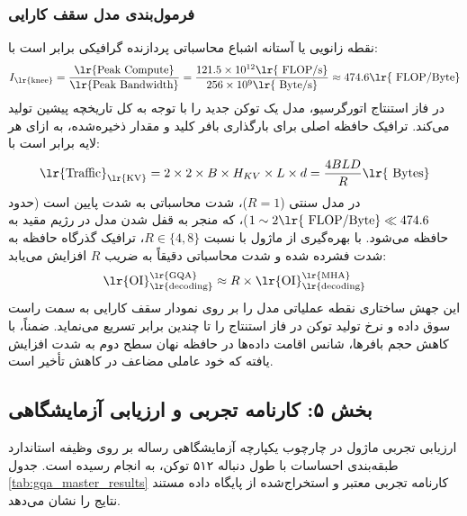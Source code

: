 \subsubsection*{فرمول‌بندی مدل سقف کارایی }
نقطه زانویی یا آستانه اشباع محاسباتی  پردازنده گرافیکی  برابر است با:
\begin{equation}
I_{\text{\lr{knee}}} = \frac{\text{\lr{Peak Compute}}}{\text{\lr{Peak Bandwidth}}} = \frac{121.5 \times 10^{12} \text{\lr{ FLOP/s}}}{256 \times 10^9 \text{\lr{ Byte/s}}} \approx 474.6 \text{\lr{ FLOP/Byte}}
\end{equation}
در فاز استنتاج اتورگرسیو، مدل یک توکن جدید را با توجه به کل تاریخچه پیشین تولید می‌کند. ترافیک حافظه اصلی برای بارگذاری بافر کلید و مقدار ذخیره‌شده، به ازای هر لایه برابر است با:
\begin{equation}
\text{\lr{Traffic}}_{\text{\lr{KV}}} = 2 \times 2 \times B \times H_{KV} \times L \times d = \frac{4 B L D}{R} \text{\lr{ Bytes}}
\end{equation}
در مدل سنتی  ($R=1$)، شدت محاسباتی به شدت پایین است (حدود $1 \sim 2 \text{\lr{ FLOP/Byte}} \ll 474.6$)، که منجر به قفل شدن مدل در رژیم مقید به حافظه  می‌شود. با بهره‌گیری از ماژول  با نسبت $R \in \{4, 8\}$، ترافیک گذرگاه حافظه به شدت فشرده شده و شدت محاسباتی دقیقاً به ضریب $R$ افزایش می‌یابد:
\begin{equation}
\text{\lr{OI}}_{\text{\lr{decoding}}}^{\text{\lr{GQA}}} \approx R \times \text{\lr{OI}}_{\text{\lr{decoding}}}^{\text{\lr{MHA}}}
\end{equation}
این جهش ساختاری نقطه عملیاتی مدل را بر روی نمودار سقف کارایی به سمت راست سوق داده و نرخ تولید توکن در فاز استنتاج را تا چندین برابر تسریع می‌نماید. ضمناً، با کاهش حجم بافرها، شانس اقامت داده‌ها در حافظه نهان سطح دوم  به شدت افزایش یافته که خود عاملی مضاعف در کاهش تأخیر است.

\subsection*{بخش ۵: کارنامه تجربی و ارزیابی آزمایشگاهی }
ارزیابی تجربی ماژول  در چارچوب یکپارچه آزمایشگاهی رساله بر روی وظیفه استاندارد طبقه‌بندی احساسات  با طول دنباله ۵۱۲ توکن، به انجام رسیده است. جدول \ref{tab:gqa_master_results} کارنامه تجربی معتبر و استخراج‌شده از پایگاه داده مستند نتایج را نشان می‌دهد.

